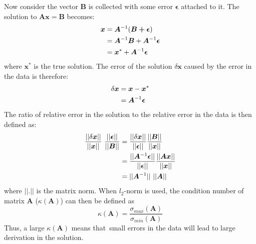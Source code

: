 			Now consider the vector $\boldsymbol{B}$ is collected with some error $\boldsymbol{\epsilon}$ attached to it. 
			The solution to $\boldsymbol{Ax}=\boldsymbol{B}$ becomes:
			\begin{align}
				\boldsymbol{x}&=\boldsymbol{A}^{-1}(\boldsymbol{B+\epsilon}) \\\notag
				&= \boldsymbol{A}^{-1}\boldsymbol{B}+\boldsymbol{A}^{-1}\boldsymbol{\epsilon}\\\notag
				&= \boldsymbol{x}^*+\boldsymbol{A}^{-1}\boldsymbol{\epsilon}
			\end{align}
			where $\boldsymbol{x}^*$ is the true solution.
			The error of the solution $\delta \boldsymbol{x}$ caused by the error in the data is therefore:
			\begin{align}
			\delta \boldsymbol{x}&=\boldsymbol{x}-\boldsymbol{x}^*\\ \notag
			&=\boldsymbol{A}^{-1}\boldsymbol{\epsilon}
			\end{align}
			The ratio of relative error in the solution to the relative error in the data is then defined as:
			\begin{align}
			\frac{||\delta \boldsymbol{x}||}{||\boldsymbol{x}||}\ \frac{||\boldsymbol{\epsilon}|| }{||\boldsymbol{B}||}
			&=\frac{||\delta \boldsymbol{x}||}{||\boldsymbol{\epsilon}|| } \frac{||\boldsymbol{B}|| }{||\boldsymbol{x}||} \notag\\ 
			&= \frac{||\boldsymbol{A}^{-1}\boldsymbol{\epsilon}||}{||\boldsymbol{\epsilon}|| } \frac{||\boldsymbol{Ax}|| }{||\boldsymbol{x}||} \notag\\
			&= ||\boldsymbol{A}^{-1}||\ ||\boldsymbol{A}||
			\end{align}
			where $||.||$ is the matrix norm.
			When $l_2$-norm is used, the condition number of matrix $\boldsymbol{A}$  ($\kappa(\boldsymbol{A})$) can then be defined as
			$$
			\kappa(\boldsymbol{A}) = \frac{\sigma_{max}(\boldsymbol{A})}{\sigma_{min}(\boldsymbol{A})}
			$$
			Thus, a large $\kappa(\boldsymbol{A})$ means that\ small errors in the data will lead to large derivation in the solution.
				
